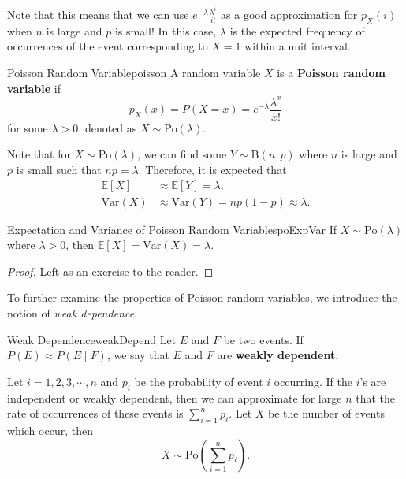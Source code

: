 \documentclass[math]{amznotes}
\theoremstyle{remark}
\newcommand{\0}{\mathbf{0}}
\newcommand{\1}{\mathbf{1}}
\begin{document}
Note that this means that we can use $e^{-\lambda}\frac{\lambda^i}{i!}$ as a good approximation for $p_X(i)$ when $n$ is large and $p$ is small! In this case, $\lambda$ is the expected frequency of occurrences of the event corresponding to $X = 1$ within a unit interval.
\begin{dfnbox}{Poisson Random Variable}{poisson}
    A random variable $X$ is a {\color{red} \textbf{Poisson random variable}} if 
    \begin{equation*}
        p_X(x) = P(X = x) = e^{-\lambda}\frac{\lambda^x}{x!}
    \end{equation*}
    for some $\lambda > 0$, denoted as $X \sim \mathrm{Po}(\lambda)$.
\end{dfnbox}
Note that for $X \sim \mathrm{Po}(\lambda)$, we can find some $Y \sim \mathrm{B}(n, p)$ where $n$ is large and $p$ is small such that $np = \lambda$. Therefore, it is expected that 
\begin{align*}
    \mathbb{E}[X] & \approx \mathbb{E}[Y] = \lambda, \\
    \mathrm{Var}(X) & \approx \mathrm{Var}(Y) = np(1 - p) \approx \lambda.
\end{align*}
\begin{probox}{Expectation and Variance of Poisson Random Variables}{poExpVar}
    If $X \sim \mathrm{Po}(\lambda)$ where $\lambda > 0$, then $\mathbb{E}[X] = \mathrm{Var}(X) = \lambda$.
    \tcblower
    \begin{proof}
        Left as an exercise to the reader.
    \end{proof}
\end{probox}
To further examine the properties of Poisson random variables, we introduce the notion of \textit{weak dependence}.
\begin{dfnbox}{Weak Dependence}{weakDepend}
    Let $E$ and $F$ be two events. If $P(E) \approx P(E\mid F)$, we say that $E$ and $F$ are {\color{red} \textbf{weakly dependent}}.
\end{dfnbox}
Let $i = 1, 2, 3, \cdots, n$ and $p_i$ be the probability of event $i$ occurring. If the $i$'s are independent or weakly dependent, then we can approximate for large $n$ that the rate of occurrences of these events is $\sum_{i = 1}^{n}p_i$. Let $X$ be the number of events which occur, then 
\begin{equation*}
    X \sim \mathrm{Po}\left(\sum_{i = 1}^{n}p_i\right).
\end{equation*}
\end{document}
